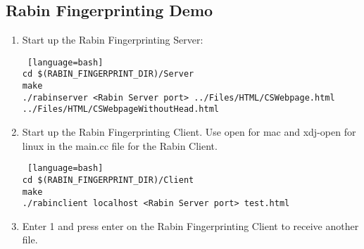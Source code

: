 \subsection{Rabin Fingerprinting Demo}

\begin{enumerate}

\item 

Start up the Rabin Fingerprinting Server:

\begin{lstlisting} [language=bash] 
cd $(RABIN_FINGERPRINT_DIR)/Server
make
./rabinserver <Rabin Server port> ../Files/HTML/CSWebpage.html ../Files/HTML/CSWebpageWithoutHead.html
\end{lstlisting}

\item Start up the Rabin Fingerprinting Client. Use open for mac and xdj-open for linux in the main.cc file for the Rabin Client.

\begin{lstlisting} [language=bash] 
cd $(RABIN_FINGERPRINT_DIR)/Client
make
./rabinclient localhost <Rabin Server port> test.html
\end{lstlisting}

\item Enter 1 and press enter on the Rabin Fingerprinting Client to receive another file. 

\end{enumerate}

